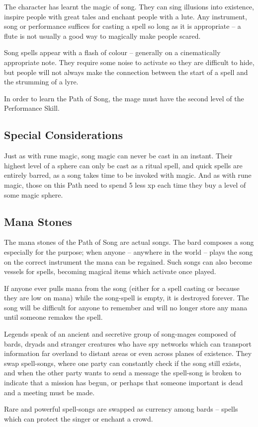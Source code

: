 \documentclass[titlepage,a4paper,openany]{book}
\begin{document}
\begin{multicols}{2}

The character has learnt the magic of song. They can sing illusions into existence, inspire people with great tales and enchant people with a lute. Any instrument, song or performance suffices for casting a spell so long as it is appropriate -- a flute is not usually a good way to magically make people scared.

Song spells appear with a flash of colour -- generally on a cinematically appropriate note. They require some noise to activate so they are difficult to hide, but people will not always make the connection between the start of a spell and the strumming of a lyre.

In order to learn the Path of Song, the mage must have the second level of the Performance Skill. 

\subsection{Special Considerations}

Just as with rune magic, song magic can never be cast in an instant.  Their highest level of a sphere can only be cast as a ritual spell, and quick spells are entirely barred, as a song takes time to be invoked with magic.  And as with rune magic, those on this Path need to spend 5 less \gls{xp} each time they buy a level of some magic sphere.

\subsection{Mana Stones}

The mana stones of the Path of Song are actual songs. The bard composes a song especially for the purpose; when anyone -- anywhere in the world -- plays the song on the correct instrument the mana can be regained. Such songs can also become vessels for spells, becoming magical items which activate once played.

If anyone ever pulls mana from the song (either for a spell casting or because they are low on mana) while the song-spell is empty, it is destroyed forever. The song will be difficult for anyone to remember and will no longer store any mana until someone remakes the spell.

Legends speak of an ancient and secretive group of song-mages composed of bards, dryads and stranger creatures who have spy networks which can transport information far overland to distant areas or even across planes of existence. They swap spell-songs, where one party can constantly check if the song still exists, and when the other party wants to send a message the spell-song is broken to indicate that a mission has begun, or perhaps that someone important is dead and a meeting must be made.

Rare and powerful spell-songs are swapped as currency among bards -- spells which can protect the singer or enchant a crowd.

\end{multicols}
\end{document}

